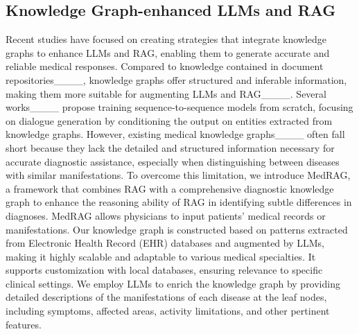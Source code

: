 \subsection{Knowledge Graph-enhanced LLMs and RAG}
Recent studies have focused on creating strategies that integrate knowledge graphs to enhance LLMs and RAG, enabling them to generate accurate and reliable medical responses. Compared to knowledge contained in document repositories____, knowledge graphs offer structured and inferable information, making them more suitable for augmenting LLMs and RAG____. 
Several works____ propose training sequence-to-sequence models from scratch, focusing on dialogue generation by conditioning the output on entities extracted from knowledge graphs.
% 
However, existing medical knowledge graphs____ often fall short because they lack the detailed and structured information necessary for accurate diagnostic assistance, especially when distinguishing between diseases with similar manifestations. To overcome this limitation, we introduce MedRAG, a framework that combines RAG with a comprehensive diagnostic knowledge graph to enhance the reasoning ability of RAG in identifying subtle differences in diagnoses. MedRAG allows physicians to input patients' medical records or manifestations.
Our knowledge graph is constructed based on patterns extracted from Electronic Health Record (EHR) databases and augmented by LLMs, making it highly scalable and adaptable to various medical specialties. It supports customization with local databases, ensuring relevance to specific clinical settings. We employ LLMs to enrich the knowledge graph by providing detailed descriptions of the manifestations of each disease at the leaf nodes, including symptoms, affected areas, activity limitations, and other pertinent features.